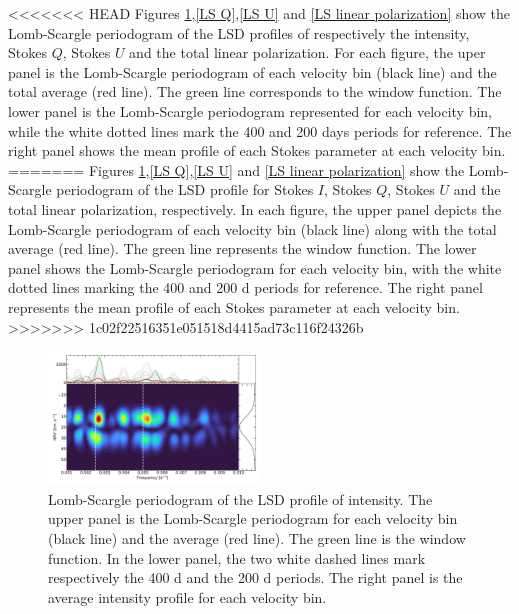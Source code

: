 \documentclass{aa}
\begin{document}

<<<<<<< HEAD
Figures \ref{LS intensity},\ref{LS Q},\ref{LS U} and \ref{LS linear polarization} show the Lomb-Scargle periodogram of the LSD profiles of respectively 
the intensity, Stokes $Q$, Stokes $U$ and the total linear polarization. 
For each figure, the uper panel is the Lomb-Scargle periodogram of each velocity bin (black line) and the total average (red line). The green line corresponds to the window function. 
The lower panel is the Lomb-Scargle periodogram represented for each velocity bin, while the white dotted lines mark the 400 and 200 days periods for 
reference. The right panel shows the mean profile of each Stokes parameter at each velocity bin.
=======
Figures \ref{LS intensity},\ref{LS Q},\ref{LS U} and \ref{LS linear polarization} show the Lomb-Scargle periodogram of the LSD profile for Stokes $I$, Stokes $Q$, Stokes $U$ and the total linear polarization, respectively. 
In each figure, the upper panel depicts the Lomb-Scargle periodogram of each velocity bin (black line) along with the total average (red line). The green line represents the window function. The lower panel shows the Lomb-Scargle periodogram for each velocity bin, with the white dotted lines marking the 400 and 200 d periods for reference. The right panel represents the mean profile of each Stokes parameter at each velocity bin.
>>>>>>> 1c02f22516351e051518d4415ad73c116f24326b

\begin{figure}[!h]
    \centering
    \includegraphics[width=0.5\textwidth]{Lomb-Scargle Intensity.pdf}
    \caption{Lomb-Scargle periodogram of the LSD profile of intensity.
    The upper panel is the Lomb-Scargle periodogram for each velocity bin (black line) and the average (red line). The green line is the window function.
    In the lower panel, the two white dashed lines mark respectively the 400 d and the 200 d periods. The right panel is the average intensity profile for each velocity bin.}
    \label{LS intensity}
\end{figure}
\end{document}
